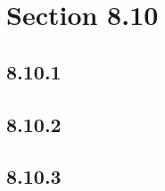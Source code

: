 





\section*{Section 8.10}

\subsection*{8.10.1}
\begin{enumerate}
\end{enumerate}

\subsection*{8.10.2}
\begin{enumerate}
\end{enumerate}

\subsection*{8.10.3}
\begin{enumerate}
\end{enumerate}

